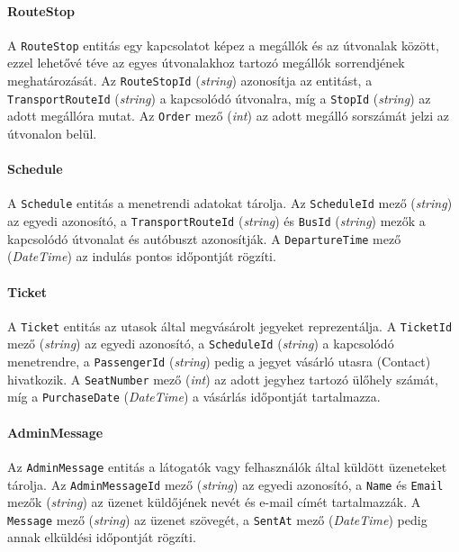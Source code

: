\paragraph{RouteStop}

A \texttt{RouteStop} entitás egy kapcsolatot képez a megállók és az útvonalak között, ezzel lehetővé téve az egyes útvonalakhoz tartozó megállók sorrendjének meghatározását. Az \texttt{RouteStopId} (\textit{string}) azonosítja az entitást, a \texttt{TransportRouteId} (\textit{string}) a kapcsolódó útvonalra, míg a \texttt{StopId} (\textit{string}) az adott megállóra mutat. Az \texttt{Order} mező (\textit{int}) az adott megálló sorszámát jelzi az útvonalon belül.

\paragraph{Schedule}

A \texttt{Schedule} entitás a menetrendi adatokat tárolja. Az \texttt{ScheduleId} mező (\textit{string}) az egyedi azonosító, a \texttt{TransportRouteId} (\textit{string}) és \texttt{BusId} (\textit{string}) mezők a kapcsolódó útvonalat és autóbuszt azonosítják. A \texttt{DepartureTime} mező (\textit{DateTime}) az indulás pontos időpontját rögzíti.

\paragraph{Ticket}

A \texttt{Ticket} entitás az utasok által megvásárolt jegyeket reprezentálja. A \texttt{TicketId} mező (\textit{string}) az egyedi azonosító, a \texttt{ScheduleId} (\textit{string}) a kapcsolódó menetrendre, a \texttt{PassengerId} (\textit{string}) pedig a jegyet vásárló utasra (Contact) hivatkozik. A \texttt{SeatNumber} mező (\textit{int}) az adott jegyhez tartozó ülőhely számát, míg a \texttt{PurchaseDate} (\textit{DateTime}) a vásárlás időpontját tartalmazza.

\paragraph{AdminMessage}

Az \texttt{AdminMessage} entitás a látogatók vagy felhasználók által küldött üzeneteket tárolja. Az \texttt{AdminMessageId} mező (\textit{string}) az egyedi azonosító, a \texttt{Name} és \texttt{Email} mezők (\textit{string}) az üzenet küldőjének nevét és e-mail címét tartalmazzák. A \texttt{Message} mező (\textit{string}) az üzenet szövegét, a \texttt{SentAt} mező (\textit{DateTime}) pedig annak elküldési időpontját rögzíti.

